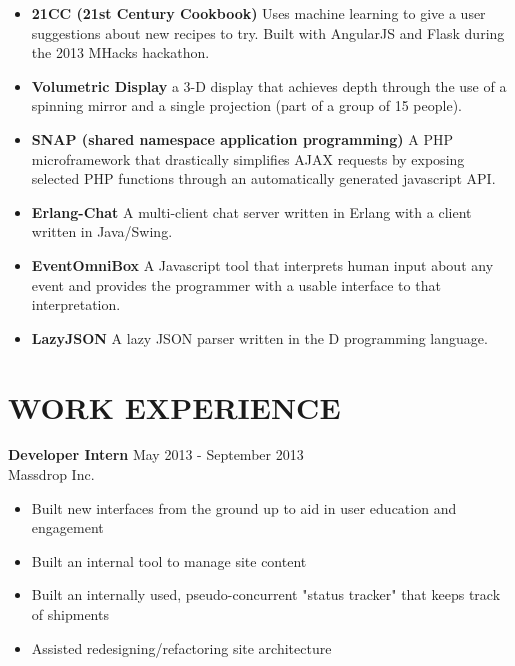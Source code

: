 \documentclass[line,margin]{res}
\begin{document}
\begin{resume}
\begin{itemize}
\item {\bf 21CC (21st Century Cookbook)} Uses machine learning to give a user 
   suggestions about new recipes to try. Built with AngularJS and Flask during
   the 2013 MHacks hackathon.

\item {\bf Volumetric Display} a 3-D display that achieves depth through the 
   use of a spinning mirror and a single projection 
   (part of a group of 15 people).

\item {\bf SNAP (shared namespace application programming)} 
   A PHP microframework that drastically simplifies AJAX requests by 
   exposing selected PHP functions through an automatically generated
   javascript API.




\item {\bf Erlang-Chat}   A multi-client chat server written in Erlang with a 
   client written in Java/Swing.

\item {\bf EventOmniBox}  A Javascript tool that interprets human input about 
   any event and provides the programmer with a usable interface to that 
   interpretation.


\item {\bf LazyJSON}  A lazy JSON parser written in the D programming language.


\end{itemize}
 
\section{WORK EXPERIENCE} 
			   {\bf Developer Intern} \hfill May 2013 - September 2013\\
			   Massdrop Inc.
			   \begin{itemize} \itemsep -2pt
				  \item Built new interfaces from the ground up to aid in user education and engagement
				  \item Built an internal tool to manage site content
				  \item Built an internally used, pseudo-concurrent "status tracker" that keeps track
					 of shipments
				  \item Assisted redesigning/refactoring site architecture
			   \end{itemize}


\end{resume}
\end{document}
